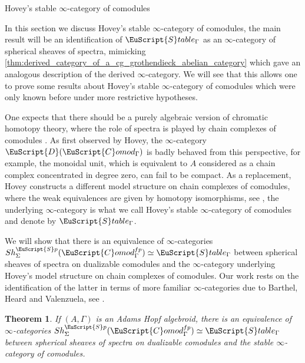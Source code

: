 \documentclass[oneside,a4paper]{amsart}
\makeatletter
\newcommand{\euscr}[1]{\EuScript{#1}} %
\newcommand{\dcat}{\euscr{D}} %
\newcommand{\spectra}{\euscr{S}p} %
\newcommand{\Comod}{\euscr{C}omod} %
\newcommand{\ComodGamma}{\Comod_{\Gamma}} %
\theoremstyle{plain}
\newtheorem{thm}{Theorem}[section]
\theoremstyle{definition}
\theoremstyle{remark}
\def\subsection{\@startsection{subsection}{1}%
  \z@{.7\linespacing\@plus\linespacing}{.5\linespacing}%
  {\normalfont\bfseries\centering}}%
\makeatother
\begin{document}
\subsection{Hovey's stable $\infty$-category of comodules}

In this section we discuss Hovey's stable $\infty$-category of comodules, the main result will be an identification of $\euscr{S}table_{\Gamma}$ as an $\infty$-category of spherical sheaves of spectra, mimicking \cref{thm:derived_category_of_a_cg_grothendieck_abelian_category} which gave an analogous description of the derived $\infty$-category. We will see that this allows one to prove some results about Hovey's stable $\infty$-category of comodules which were only known before under more restrictive hypotheses. 

One expects that there should be a purely algebraic version of chromatic homotopy theory, where the role of spectra is played by chain complexes of comodules \cite{barthel2017algebraic}. As first observed by Hovey, the $\infty$-category $\dcat(\ComodGamma)$ is badly behaved from this perspective, for example, the monoidal unit, which is equivalent to $A$ considered as a chain complex concentrated in degree zero, can fail to be compact. As a replacement, Hovey constructs a different model structure on chain complexes of comodules, where the weak equivalences are given by homotopy isomorphisms, see \cite{hovey2003homotopy}, the underlying $\infty$-category is what we call Hovey's stable $\infty$-category of comodules and denote by $\euscr{S}table_{\Gamma}$. 

We will show that there is an equivalence of $\infty$-categories $Sh_{\Sigma}^{\spectra}(\ComodGamma^{fp}) \simeq \euscr{S}table_{\Gamma}$ between spherical sheaves of spectra on dualizable comodules and the $\infty$-category underlying Hovey's model structure on chain complexes of comodules. Our work rests on the identification of the latter in terms of more familiar $\infty$-categories due to Barthel, Heard and Valenzuela, see \cite{barthel2015local}. 

\begin{thm}
\label{thm:hovey_stable_homotopy_theory_of_comodules_as_spherical_sheaves}
If $(A, \Gamma)$ is an Adams Hopf algebroid, there is an equivalence of $\infty$-categories $Sh_{\Sigma}^{\spectra}(\ComodGamma^{fp}) \simeq \euscr{S}table_{\Gamma}$ between spherical sheaves of spectra on dualizable comodules and the stable $\infty$-category of comodules. 
\end{thm}
\end{document}
